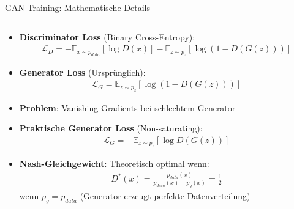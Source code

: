 \documentclass[aspectratio=1610, xcolor=dvipsnames, 9pt]{beamer}
\begin{document}
\begin{frame}{GAN Training: Mathematische Details}
  \begin{columns}
    \begin{column}{1\textwidth}
      \begin{itemize}
        \item \textbf{Discriminator Loss} (Binary Cross-Entropy):
        \begin{align}
          \mathcal{L}_D = -\mathbb{E}_{x \sim p_{data}}[\log D(x)] - \mathbb{E}_{z \sim p_z}[\log(1-D(G(z)))]
        \end{align}
        \item \textbf{Generator Loss} (Ursprünglich):
        \begin{align}
          \mathcal{L}_G = \mathbb{E}_{z \sim p_z}[\log(1-D(G(z)))]
        \end{align}
        \item \textbf{Problem}: Vanishing Gradients bei schlechtem Generator
        \item \textbf{Praktische Generator Loss} (Non-saturating):
        \begin{align}
          \mathcal{L}_G = -\mathbb{E}_{z \sim p_z}[\log D(G(z))]
        \end{align}
        \item \textbf{Nash-Gleichgewicht}: Theoretisch optimal wenn:
        \begin{align}
          D^*(x) = \frac{p_{data}(x)}{p_{data}(x) + p_g(x)} = \frac{1}{2}
        \end{align}
        wenn $p_g = p_{data}$ (Generator erzeugt perfekte Datenverteilung)
      \end{itemize}
    \end{column}
  \end{columns}
\end{frame}
\end{document}
